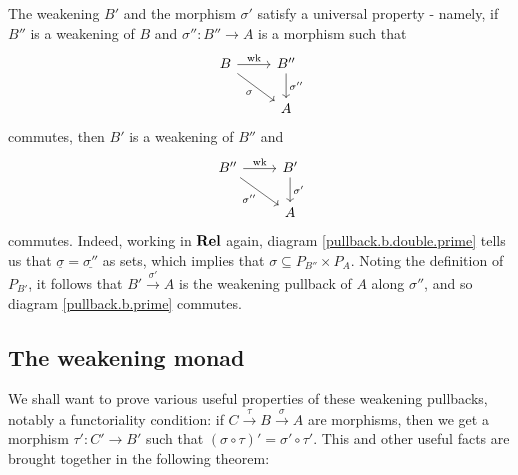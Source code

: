 \documentclass[11pt]{article} %
\theoremstyle{plain} %
\theoremstyle{definition} %
\theoremstyle{note}
\theoremstyle{exercisestyle}
\newcommand{\catname}[1]{{\normalfont\textbf{#1}}}
\newcommand{\Rel}{\catname{Rel}}
\newcommand{\map}[3]{#2\xrightarrow{#1} #3}
\newcommand*\from{\colon}
\newcommand{\cmap}[3]{#1\from{}#2\to{}#3}
\newcommand{\comp}[2]{#1 \circ #2}
\newcommand{\grel}[1]{\underline{#1}}
\DeclareMathOperator{\wk}{wk}
\renewcommand{\subset}{\subseteq}
\begin{document}
The weakening $B'$ and the morphism $\sigma'$ satisfy a universal property - namely, if $B''$ is a weakening of $B$ and $\cmap{\sigma''}{B''}{A}$ is a morphism such that
\begin{equation}
  \label{pullback.b.double.prime}
  \begin{tikzcd}
    B \arrow[r, "\wk"] \arrow[dr, "\sigma"']
      & B'' \arrow[d, "\sigma''"] \\
      & A
  \end{tikzcd}
\end{equation}
commutes, then $B'$ is a weakening of $B''$ and 
\begin{equation}
  \label{pullback.b.prime}
  \begin{tikzcd}
    B'' \arrow[r, "\wk"] \arrow[dr, "\sigma''"']
      & B' \arrow[d, "\sigma'"] \\
      & A
  \end{tikzcd}
\end{equation}
commutes.  Indeed, working in $\Rel$ again, diagram \eqref{pullback.b.double.prime} tells us that $\grel\sigma=\grel{\sigma''}$ as sets, which implies that $\sigma\subset P_{B''}\times P_A$.  Noting the definition of $P_{B'}$, it follows that $\map{\sigma'}{B'}{A}$ is the weakening pullback of $A$ along $\sigma''$, and so diagram \eqref{pullback.b.prime} commutes.

\subsection{The weakening monad}

We shall want to prove various useful properties of these weakening pullbacks, notably a functoriality condition: if $C\xrightarrow{\tau}\map{\sigma}{B}{A}$ are morphisms, then we get a morphism $\cmap{\tau'}{C'}{B'}$ such that $(\comp\sigma\tau)'=\comp{\sigma'}{\tau'}$.  This and other useful facts are brought together in the following theorem:
\end{document}
